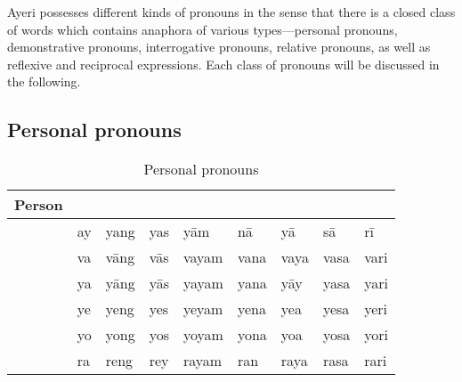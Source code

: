 Ayeri possesses different kinds of pronouns in the sense that there is a closed
class of words which contains anaphora of various types---personal pronouns,
demonstrative pronouns, interrogative pronouns, relative pronouns, as well as
reflexive and reciprocal expressions. Each class of pronouns will be discussed
in the following.

\subsection{Personal pronouns}
\label{subsec:perspro}

\begin{table}[tp]\centering
\caption{Personal pronouns}

\begin{tabu} to \linewidth{l X[c] X[c] X[c] X[c] X[c] X[c] X[c] X[c]}
\tableheaderfont\toprule
Person
	& \Top{}
	& \Aarg{}
	& \Parg{}
	& \Dat{}
	& \Gen{}
	& \Loc{}
	& \Caus{}
	& \Ins{}
	\\
\toprule

\Fsg{}
	& ay	%
	& yang	%
	& yas	%
	& yām	%
	& nā	%
	& yā	%
	& sā	%
	& rī	%
	\\
	
\midrule

\Ssg{}
	& va	%
	& vāng	%
	& vās	%
	& vayam	%
	& vana	%
	& vaya	%
	& vasa	%
	& vari	%
	\\

\midrule

\TsgM{}
	& ya	%
	& yāng	%
	& yās	%
	& yayam	%
	& yana	%
	& yāy	%
	& yasa	%
	& yari	%
	\\

\TsgF{}
	& ye	%
	& yeng	%
	& yes	%
	& yeyam	%
	& yena	%
	& yea	%
	& yesa	%
	& yeri	%
	\\

\TsgN{}
	& yo	%
	& yong	%
	& yos	%
	& yoyam	%
	& yona	%
	& yoa	%
	& yosa	%
	& yori	%
	\\

\TsgI{}
	& ra	%
	& reng	%
	& rey	%
	& rayam	%
	& ran	%
	& raya	%
	& rasa	%
	& rari	%
	\\

\midrule


\end{tabu}
\end{table}
